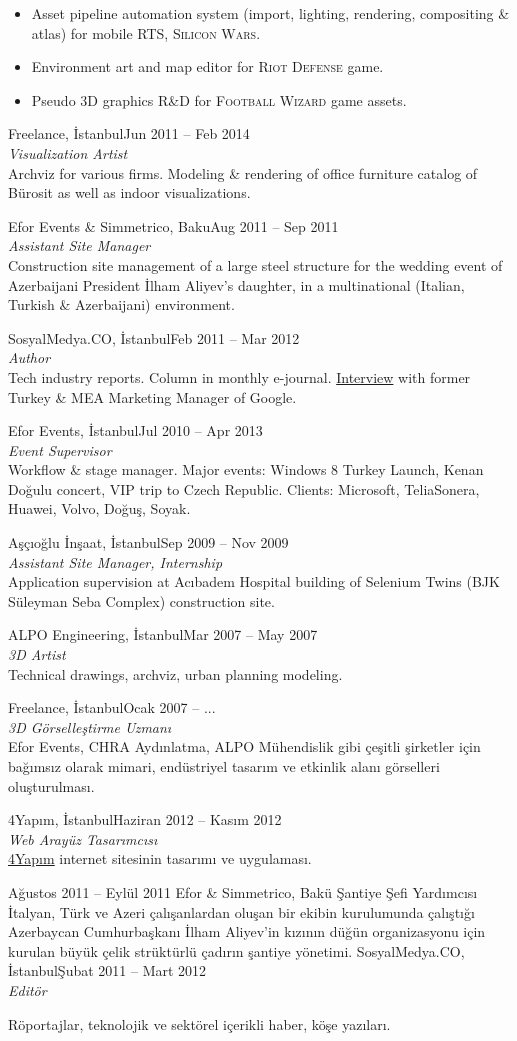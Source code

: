 \documentclass[8pt]{scrartcl}
\newenvironment{xplist}{%
  \setlist{nosep}
  \newcommand\xpitem[4]{%
    {\color{header}%
      \sc##2\hfill ##1}\\[2pt]
    {\Large\textit{##3}
      \smallskip} \\%
    {##4\bigskip}%

  }}%
{\setlist{}}
\newcommand{\project}[1]{\textsc{\color{teal}#1}}
\begin{document}
\begin{xplist}
{{      \begin{itemize}
      \item  Asset  pipeline   automation  system  (import,  lighting,
        rendering,   compositing    \&   atlas)   for    mobile   RTS,
        \project{Silicon Wars}.
      \item Environment art and  map editor for \project{Riot Defense}
        game.
      \item Pseudo 3D graphics R\&D for \project{Football Wizard} game
        assets.
      \end{itemize}}%
    \xpitem%
    {Jun 2011 -- Feb 2014}%
    {Freelance, İstanbul}%
    {Visualization Artist}{%
      Archviz  for various  firms.   Modeling \&  rendering of  office
      furniture catalog of Bürosit as well as indoor visualizations.}%
    \xpitem%
    {Aug 2011 -- Sep 2011}%
    {Efor Events \& Simmetrico, Baku}%
    {Assistant Site Manager}{%
      Construction site management of a  large steel structure for the
      wedding event of Azerbaijani  President İlham Aliyev's daughter,
      in   a   multinational   (Italian,   Turkish   \&   Azerbaijani)
      environment.}%
    \xpitem%
    {Feb 2011 -- Mar 2012}%
    {SosyalMedya.CO, İstanbul}%
    {Author}{%
      Tech   industry   reports.    Column   in   monthly   e-journal.
      \href{http://sosyalmedya.co/google-mustafa-icil/}{Interview}
      with former Turkey \& MEA Marketing Manager of Google.}%
    \xpitem%
    {Jul 2010 -- Apr 2013}%
    {Efor Events, İstanbul}%
    {Event Supervisor}{%
      Workflow  \&  stage manager.   Major  events:  Windows 8  Turkey
      Launch,  Kenan  Doğulu  concert,  VIP trip  to  Czech  Republic.
      Clients: Microsoft, TeliaSonera, Huawei, Volvo, Doğuş, Soyak.}%
    \xpitem%
    {Sep 2009 -- Nov 2009}%
    {Aşçıoğlu İnşaat, İstanbul}%
    {Assistant Site Manager, Internship}{%
      Application  supervision   at  Acıbadem  Hospital   building  of
      Selenium Twins (BJK Süleyman Seba Complex) construction site.}%
    \xpitem%
    {Mar 2007 -- May 2007}%
    {ALPO Engineering, İstanbul}%
    {3D Artist}{%
      Technical drawings, archviz, urban planning modeling.}}%
  {%
    \xpitem%
    {Ocak 2007 -- ...}%
    {Freelance, İstanbul}%
    {3D Görselleştirme Uzmanı}{%
      Efor  Events, CHRA  Aydınlatma,  ALPO  Mühendislik gibi  çeşitli
      şirketler için  bağımsız olarak  mimari, endüstriyel  tasarım ve
      etkinlik alanı görselleri oluşturulması.}%
    \xpitem%
    {Haziran 2012 -- Kasım 2012}%
    {4Yapım, İstanbul}%
    {Web Arayüz Tasarımcısı}{%
      \href{http://www.4yapim.com/}{4Yapım}     internet     sitesinin
      tasarımı ve uygulaması.}%
    \xpitme%
    {Ağustos 2011 -- Eylül 2011}%
    {Efor \& Simmetrico, Bakü}%
    {Şantiye Şefi Yardımcısı}{%
      İtalyan,  Türk   ve  Azeri   çalışanlardan  oluşan   bir  ekibin
      kurulumunda çalıştığı  Azerbaycan Cumhurbaşkanı  İlham Aliyev'in
      kızının düğün organizasyonu için  kurulan büyük çelik strüktürlü
      çadırın şantiye yönetimi.}%
    \xpitem%
    {Şubat 2011 -- Mart 2012}%
    {SosyalMedya.CO, İstanbul}%
    {Editör}{%
      Röportajlar,  teknolojik   ve  sektörel  içerikli   haber,  köşe
      yazıları.

}}
\end{xplist}
\end{document}
